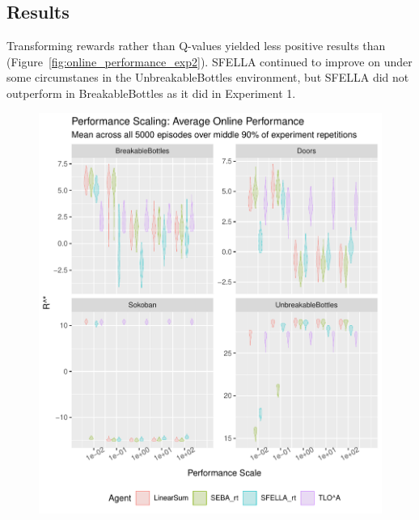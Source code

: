\subsection{Results}

Transforming rewards rather than Q-values yielded less positive results than \tloA{} (Figure~\ref{fig:online_performance_exp2}). SFELLA continued to improve on \tloA{} under some circumstanes in the UnbreakableBottles environment, but SFELLA did not outperform \tloA{} in BreakableBottles as it did in Experiment 1. 

\begin{figure}
  \includegraphics[width=\columnwidth]{output/multirun_n100_reward_to_util_transformonline_util_transform_Performance.pdf}

\end{figure}
